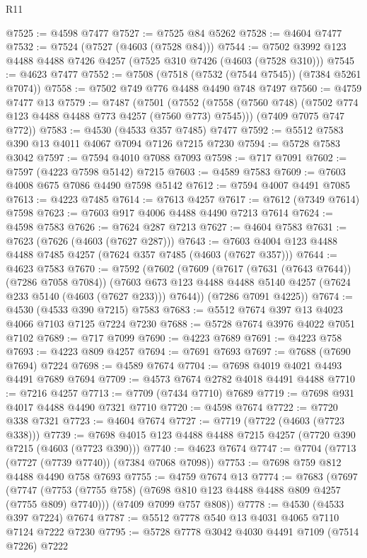 \begin{lexlean}{R11}
\begin{coremodule}
@7525 := @4598 @7477
@7527 := @7525 @84 @5262
@7528 := @4604 @7477
@7532 := @7524 (@7527 (@4603 (@7528 @84)))
@7544 := @7502 @3992 @123 @4488 @4488 @7426 @4257 (@7525 @310 @7426 (@4603 (@7528 @310)))
@7545 := @4623 @7477
@7552 := @7508 (@7518 (@7532 (@7544 @7545)) (@7384 @5261 @7074))
@7558 := @7502 @749 @776 @4488 @4490 @748 @7497
@7560 := @4759 @7477 @13
@7579 := @7487
    (@7501
      (@7552 (@7558 (@7560 @748) (@7502 @774 @123 @4488 @4488 @773 @4257 (@7560 @773) @7545)))
      (@7409 @7075 @747 @772))
@7583 := @4530 (@4533 @357 @7485) @7477
@7592 := @5512 @7583 @390 @13 @4011 @4067 @7094 @7126 @7215 @7230
@7594 := @5728 @7583 @3042
@7597 := @7594 @4010 @7088 @7093
@7598 := @717 @7091
@7602 := @7597 (@4223 @7598 @5142) @7215
@7603 := @4589 @7583
@7609 := @7603 @4008 @675 @7086 @4490 @7598 @5142
@7612 := @7594 @4007 @4491 @7085
@7613 := @4223 @7485
@7614 := @7613 @4257
@7617 := @7612 (@7349 @7614) @7598
@7623 := @7603 @917 @4006 @4488 @4490 @7213 @7614
@7624 := @4598 @7583
@7626 := @7624 @287 @7213
@7627 := @4604 @7583
@7631 := @7623 (@7626 (@4603 (@7627 @287)))
@7643 := @7603 @4004 @123 @4488 @4488 @7485 @4257 (@7624 @357 @7485 (@4603 (@7627 @357)))
@7644 := @4623 @7583
@7670 := @7592
    (@7602
      (@7609
        (@7617 (@7631 (@7643 @7644)) (@7286 @7058 @7084))
        (@7603 @673 @123 @4488 @4488 @5140 @4257 (@7624 @233 @5140 (@4603 (@7627 @233))) @7644))
      (@7286 @7091 @4225))
@7674 := @4530 (@4533 @390 @7215) @7583
@7683 := @5512 @7674 @397 @13 @4023 @4066 @7103 @7125 @7224 @7230
@7688 := @5728 @7674 @3976 @4022 @7051 @7102
@7689 := @717 @7099
@7690 := @4223 @7689
@7691 := @4223 @758
@7693 := @4223 @809 @4257
@7694 := @7691 @7693
@7697 := @7688 (@7690 @7694) @7224
@7698 := @4589 @7674
@7704 := @7698 @4019 @4021 @4493 @4491 @7689 @7694
@7709 := @4573 @7674 @2782 @4018 @4491 @4488
@7710 := @7216 @4257
@7713 := @7709 (@7434 @7710) @7689
@7719 := @7698 @931 @4017 @4488 @4490 @7321 @7710
@7720 := @4598 @7674
@7722 := @7720 @338 @7321
@7723 := @4604 @7674
@7727 := @7719 (@7722 (@4603 (@7723 @338)))
@7739 := @7698 @4015 @123 @4488 @4488 @7215 @4257 (@7720 @390 @7215 (@4603 (@7723 @390)))
@7740 := @4623 @7674
@7747 := @7704 (@7713 (@7727 (@7739 @7740)) (@7384 @7068 @7098))
@7753 := @7698 @759 @812 @4488 @4490 @758 @7693
@7755 := @4759 @7674 @13
@7774 := @7683
    (@7697
      (@7747 (@7753 (@7755 @758) (@7698 @810 @123 @4488 @4488 @809 @4257 (@7755 @809) @7740)))
      (@7409 @7099 @757 @808))
@7778 := @4530 (@4533 @397 @7224) @7674
@7787 := @5512 @7778 @540 @13 @4031 @4065 @7110 @7124 @7222 @7230
@7795 := @5728 @7778 @3042 @4030 @4491 @7109 (@7514 @7226) @7222

\end{coremodule}
\end{lexlean}

